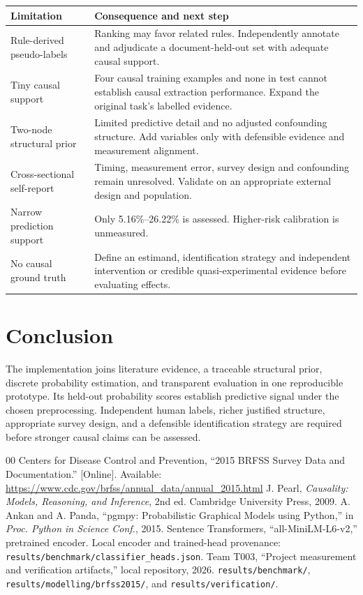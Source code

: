 \documentclass[conference]{IEEEtran}
\begin{document}
\par\noindent\begin{tabularx}{\linewidth}{@{}>{\raggedright\arraybackslash}p{.27\linewidth}>{\raggedright\arraybackslash}X@{}}\toprule
\textbf{Limitation}&\textbf{Consequence and next step}\\\midrule
Rule-derived pseudo-labels&Ranking may favor related rules. Independently annotate and adjudicate a document-held-out set with adequate causal support.\\
Tiny causal support&Four causal training examples and none in test cannot establish causal extraction performance. Expand the original task's labelled evidence.\\
Two-node structural prior&Limited predictive detail and no adjusted confounding structure. Add variables only with defensible evidence and measurement alignment.\\
Cross-sectional self-report&Timing, measurement error, survey design and confounding remain unresolved. Validate on an appropriate external design and population.\\
Narrow prediction support&Only 5.16\%--26.22\% is assessed. Higher-risk calibration is unmeasured.\\
No causal ground truth&Define an estimand, identification strategy and independent intervention or credible quasi-experimental evidence before evaluating effects.\\\bottomrule
\end{tabularx}\par\vspace{4pt}

\section{Conclusion}
The implementation joins literature evidence, a traceable structural prior, discrete probability estimation, and transparent evaluation in one reproducible prototype. Its held-out probability scores establish predictive signal under the chosen preprocessing. Independent human labels, richer justified structure, appropriate survey design, and a defensible identification strategy are required before stronger causal claims can be assessed.
\begin{thebibliography}{00}
 Centers for Disease Control and Prevention, ``2015 BRFSS Survey Data and Documentation.'' [Online]. Available: \url{https://www.cdc.gov/brfss/annual_data/annual_2015.html}
 J. Pearl, \emph{Causality: Models, Reasoning, and Inference}, 2nd ed. Cambridge University Press, 2009.
 A. Ankan and A. Panda, ``pgmpy: Probabilistic Graphical Models using Python,'' in \emph{Proc. Python in Science Conf.}, 2015.
 Sentence Transformers, ``all-MiniLM-L6-v2,'' pretrained encoder. Local encoder and trained-head provenance: \nolinkurl{results/benchmark/classifier_heads.json}.
 Team T003, ``Project measurement and verification artifacts,'' local repository, 2026. \nolinkurl{results/benchmark/}, \nolinkurl{results/modelling/brfss2015/}, and \nolinkurl{results/verification/}.
\end{thebibliography}
\end{document}
